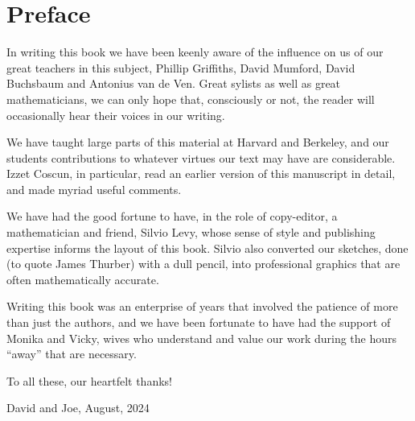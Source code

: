 

\addtocounter{chapter}{-2}
\chapter{Preface}
\label{preface}


In writing this book we have been keenly aware of  the influence on us of 
our great teachers in this subject,
Phillip Griffiths, David Mumford, David Buchsbaum and Antonius van de Ven. Great sylists
as well as great mathematicians, we can only hope that, consciously or not, the reader will occasionally hear their voices in our writing. 

We have  taught large parts of this material
at Harvard and Berkeley, and our students contributions to whatever virtues our text may have
are considerable. Izzet Coscun, in particular, read an earlier version of this manuscript in detail, and made myriad useful comments. 

We have had the good fortune to have, in the
role of copy-editor, a mathematician and friend, Silvio Levy, whose sense of style and publishing expertise informs the
layout of this book. Silvio also converted our sketches, done (to quote James Thurber) with a dull
pencil, into professional graphics that are often mathematically accurate.

Writing this book was an enterprise of years that involved the patience of more than just the authors, and we have been fortunate to have had the support of Monika and Vicky, wives who understand and value our work during the hours ``away'' that are necessary.

To all these, our heartfelt thanks!

David and Joe, August, 2024

